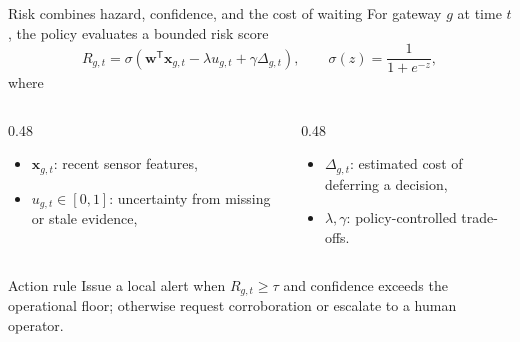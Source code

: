 \begin{frame}{Risk combines hazard, confidence, and the cost of waiting}
  For gateway $g$ at time $t$, the policy evaluates a bounded risk score
  \begin{equation*}
    R_{g,t}
    = \sigma\!\left(
      \boldsymbol{w}^{\mathsf T}\boldsymbol{x}_{g,t}
      - \lambda u_{g,t}
      + \gamma \Delta_{g,t}
    \right),
    \qquad \sigma(z)=\frac{1}{1+e^{-z}},
  \end{equation*}
  where
  \begin{columns}[T,onlytextwidth]
    \begin{column}{0.48\textwidth}
      \begin{itemize}
        \item $\boldsymbol{x}_{g,t}$: recent sensor features,
        \item $u_{g,t}\in[0,1]$: uncertainty from missing or stale evidence,
      \end{itemize}
    \end{column}
    \begin{column}{0.48\textwidth}
      \begin{itemize}
        \item $\Delta_{g,t}$: estimated cost of deferring a decision,
        \item $\lambda,\gamma$: policy-controlled trade-offs.
      \end{itemize}
    \end{column}
  \end{columns}

  \begin{block}{Action rule}
    Issue a local alert when $R_{g,t}\geq\tau$ and confidence exceeds the operational floor; otherwise request corroboration or escalate to a human operator.
  \end{block}
\end{frame}
